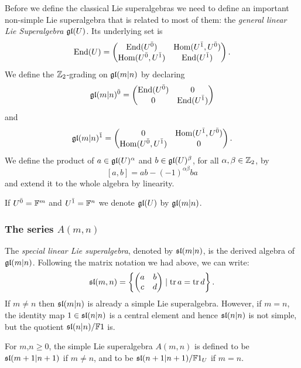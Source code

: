 Before we define the classical Lie superalgebras we need to define an important non-simple Lie superalgebra that is related to most of them: the \emph{general linear Lie Superalgebra} $\mathfrak{gl}(U)$. Its underlying set is
%
\[\operatorname{End}(U)=\left(\begin{matrix}
			\operatorname{End}(U^{\bar0})       & \operatorname{Hom}(U^{\bar1},U^{\bar0}) \\
			\operatorname{Hom}(U^{\bar0},U^{\bar1}) & \operatorname{End}(U^{\bar1})        \\
		\end{matrix}
	\right).\]
%
We define the $\mathbb{Z}_{2}$-grading on $\mathfrak{gl}(m|n)$ by declaring
\[\mathfrak{gl}(m|n)^{\bar0} = \left(\begin{matrix}
			\operatorname{End}(U^{\bar0}) & 0           \\
			0            & \operatorname{End}(U^{\bar1}) \\
		\end{matrix}
	\right)\] and
\[\mathfrak{gl}(m|n)^{\bar1} = \left(\begin{matrix}
			0                  & \operatorname{Hom}(U^{\bar1},U^{\bar0}) \\
			\operatorname{Hom}(U^{\bar0},U^{\bar1}) & 0                  \\
		\end{matrix}
	\right).\]
%
We define the product of $a\in\mathfrak{gl}(U)^{\alpha}$ and $b\in\mathfrak{gl}(U)^{\beta}$, for all $\alpha,\beta\in\mathbb{Z}_{2}$, by
\[ [a,b] = ab - (-1)^{\alpha\beta}ba\]
and extend it to the whole algebra by linearity.

If $U^{\bar0} = \mathbb{F}^m$ and $U^{\bar1} = \mathbb{F}^n$ we denote $\mathfrak{gl}(U)$ by $\mathfrak{gl}(m|n)$.

\subsubsection{The series $A(m,n)$} The \emph{special linear Lie superalgebra}, denoted by $\mathfrak{sl} (m|n)$, is the derived algebra of $\mathfrak{gl}(m|n)$. Following the matrix notation we had above, we can write:
%
\[ \mathfrak{sl}(m,n) =\left\{
	\left(\begin{matrix}
			a & b \\
			c & d \\
		\end{matrix}\right) \mid \operatorname{tr} a = \operatorname{tr} d\right\}.
\]
%
If $m\neq n$ then $\mathfrak{sl}(m|n)$ is already a simple Lie superalgebra. However, if $m=n$, the identity map $1\in \mathfrak{sl}(n|n)$ is a central element and hence $\mathfrak{sl}(n|n)$ is not simple, but the quotient $\mathfrak{sl}(n|n)/ \mathbb{F} 1$ is.

For $m$,$n\geq 0$, the simple Lie superalgebra $A(m,n)$ is defined to be $\mathfrak{sl}(m+1|n+1)$ if $m\neq n$, and to be $\mathfrak{sl}(n+1|n+1)/ \mathbb{F} 1_U$ if $m=n$.

